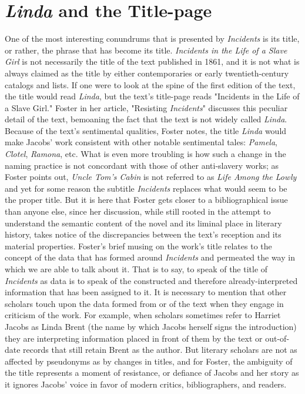 \section{\textit{Linda} and the Title-page}
One of the most interesting conundrums that is presented by \textit{Incidents} is its title, or rather, the phrase that has become its title. \textit{Incidents in the Life of a Slave Girl} is not necessarily the title of the text published in 1861, and it is not what is always claimed as the title by either contemporaries or early twentieth-century catalogs and lists. If one were to look at the spine of the first edition of the text, the title would read \textit{Linda}, but the text's title-page reads "Incidents in the Life of a Slave Girl." Foster in her article, "Resisting \textit{Incidents}" discusses this peculiar detail of the text, bemoaning the fact that the text is not widely called \textit{Linda}. Because of the text's sentimental qualities, Foster notes, the title \textit{Linda} would make Jacobs' work consistent with other notable sentimental tales: \textit{Pamela}, \textit{Clotel}, \textit{Ramona},  etc. What is even more troubling is how such a change in the naming practice is not concordant with those of other anti-slavery works; as Foster points out, \textit{Uncle Tom's Cabin} is not referred to as \textit{Life Among the Lowly} and yet for some reason the subtitle \textit{Incidents} replaces what would seem to be the proper title.\autocite[67]{frances_smith_foster_resisting_1996} But it is here that Foster gets closer to a bibliographical issue than anyone else, since her discussion, while still rooted in the attempt to understand the semantic content of the novel and its liminal place in literary history, takes notice of the discrepancies between the text's reception and its material properties. Foster's brief musing on the work's title relates to the concept of the data that has formed around \textit{Incidents} and permeated the way in which we are able to talk about it. That is to say, to speak of the title of \textit{Incidents} as data is to speak of the constructed and therefore already-interpreted information that has been assigned to it. It is necessary to mention that other scholars touch upon the data formed from or of the text when they engage in criticism of the work. For example, when scholars sometimes refer to Harriet Jacobs as Linda Brent (the name by which Jacobs herself signs the introduction) they are interpreting information placed in front of them by the text or out-of-date records that still retain Brent as the author. But literary scholars are not as affected by pseudonyms as by changes in titles, and for Foster, the ambiguity of the title represents a moment of resistance, or defiance of Jacobs and her story as it ignores Jacobs' voice in favor of modern critics, bibliographers, and readers. 

